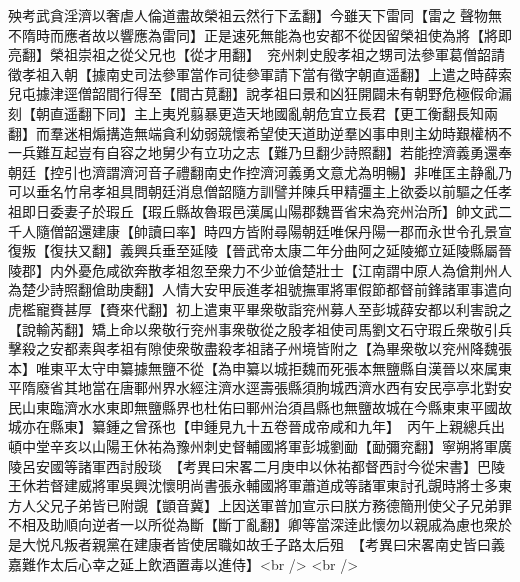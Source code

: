 殃考武貪淫濟以奢虐人倫道盡故榮祖云然行下孟翻】今雖天下雷同【雷之聲物無不隋時而應者故以響應為雷同】正是速死無能為也安都不從因留榮祖使為將【將即亮翻】榮祖崇祖之從父兄也【從才用翻】　兖州刺史殷孝祖之甥司法參軍葛僧韶請徵孝祖入朝【據南史司法參軍當作司徒參軍請下當有徵字朝直遥翻】上遣之時薛索兒屯據津逕僧韶間行得至【間古莧翻】說孝祖曰景和凶狂開闢未有朝野危極假命漏刻【朝直遥翻下同】主上夷兇翦暴更造天地國亂朝危宜立長君【更工衡翻長知兩翻】而羣迷相煽搆造無端貪利幼弱競懷希望使天道助逆羣凶事申則主幼時艱權柄不一兵難互起豈有自容之地舅少有立功之志【難乃旦翻少詩照翻】若能控濟義勇還奉朝廷【控引也濟謂濟河音子禮翻南史作控濟河義勇文意尤為明暢】非唯匡主静亂乃可以垂名竹帛孝祖具問朝廷消息僧韶隨方訓譬并陳兵甲精彊主上欲委以前驅之任孝祖即日委妻子於瑕丘【瑕丘縣故魯瑕邑漢属山陽郡魏晋省宋為兖州治所】帥文武二千人隨僧韶還建康【帥讀曰率】時四方皆附尋陽朝廷唯保丹陽一郡而永世令孔景宣復叛【復扶又翻】義興兵垂至延陵【晉武帝太康二年分曲阿之延陵鄉立延陵縣屬晉陵郡】内外憂危咸欲奔散孝祖忽至衆力不少並傖楚壯士【江南謂中原人為傖荆州人為楚少詩照翻傖助庚翻】人情大安甲辰進孝祖號撫軍將軍假節都督前鋒諸軍事遣向虎檻寵賚甚厚【賚來代翻】初上遣東平畢衆敬詣兖州募人至彭城薛安都以利害說之【說輸芮翻】矯上命以衆敬行兖州事衆敬從之殷孝祖使司馬劉文石守瑕丘衆敬引兵擊殺之安都素與孝祖有隙使衆敬盡殺孝祖諸子州境皆附之【為畢衆敬以兖州降魏張本】唯東平太守申纂據無鹽不從【為申纂以城拒魏而死張本無鹽縣自漢晉以來属東平隋廢省其地當在唐鄆州界水經注濟水逕壽張縣須朐城西濟水西有安民亭亭北對安民山東臨濟水水東即無鹽縣界也杜佑曰鄆州治須昌縣也無鹽故城在今縣東東平國故城亦在縣東】纂鍾之曾孫也【申鍾見九十五卷晉成帝咸和九年】　丙午上親總兵出頓中堂辛亥以山陽王休祐為豫州刺史督輔國將軍彭城劉勔【勔彌兖翻】寧朔將軍廣陵呂安國等諸軍西討殷琰　【考異曰宋畧二月庚申以休祐都督西討今從宋書】巴陵王休若督建威將軍吳興沈懷明尚書張永輔國將軍蕭道成等諸軍東討孔覬時將士多東方人父兄子弟皆已附覬【顗音冀】上因送軍普加宣示曰朕方務德簡刑使父子兄弟罪不相及助順向逆者一以所從為斷【斷丁亂翻】卿等當深逹此懷勿以親戚為慮也衆於是大悦凡叛者親黨在建康者皆使居職如故壬子路太后殂　【考異曰宋畧南史皆曰義嘉難作太后心幸之延上飲酒置毒以進侍】<br />
<br />
